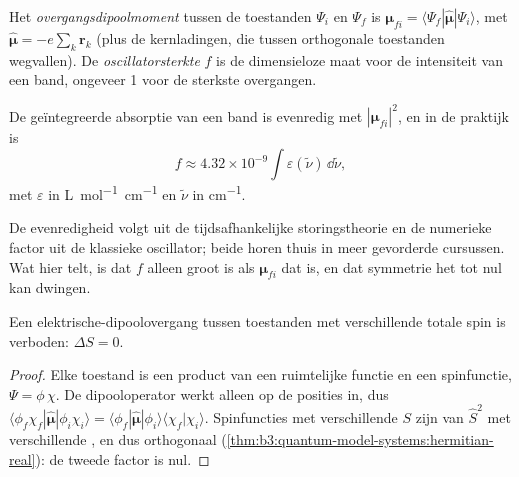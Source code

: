 \begin{definition}\label{def:b3:electronic-spectroscopy:transition-dipole}
Het \emph{overgangsdipoolmoment} tussen de
toestanden $\Psi_i$ en $\Psi_f$ is $\boldsymbol\mu_{fi} = \langle\Psi_f|\hat{\boldsymbol\mu}|\Psi_i
\rangle$, met $\hat{\boldsymbol\mu} = -e\sum_k\mathbf r_k$ (plus de
kernladingen, die tussen orthogonale toestanden wegvallen). De
\emph{oscillatorsterkte} $f$ is de dimensieloze
maat voor de intensiteit van een band, ongeveer 1 voor de sterkste
overgangen.
\end{definition}

\begin{proposition}\label{prop:b3:electronic-spectroscopy:intensity}
De geïntegreerde absorptie van een band is evenredig met $|\boldsymbol\mu_{fi}|^2$,
en in de praktijk is
\[
f \approx 4.32\times10^{-9}\int\varepsilon(\tilde\nu)\,\dd\tilde\nu,
\]
met $\varepsilon$ in \unit{L.mol^{-1}.cm^{-1}} en $\tilde\nu$ in \unit{cm^{-1}}.
\end{proposition}
\admitted

De evenredigheid volgt uit de tijdsafhankelijke storingstheorie en de
numerieke factor uit de klassieke oscillator; beide horen thuis in meer
gevorderde cursussen. Wat hier telt, is dat $f$ alleen groot is als
$\boldsymbol\mu_{fi}$ dat is, en dat symmetrie het tot nul kan dwingen.

\begin{theorem}[De spinselectieregel]\label{thm:b3:electronic-spectroscopy:spin-rule}
Een elektrische-dipoolovergang tussen toestanden met verschillende totale
spin is verboden: $\Delta S = 0$.
\end{theorem}

\begin{proof}
Elke toestand is een product van een ruimtelijke functie en een
spinfunctie, $\Psi = \phi\,\chi$.
De dipooloperator werkt alleen op de posities in, dus $\langle\phi_f\chi_f|\hat{\boldsymbol\mu}|
\phi_i\chi_i\rangle = \langle\phi_f|\hat{\boldsymbol\mu}|\phi_i\rangle\langle\chi_f|\chi_i\rangle$.
Spinfuncties met verschillende $S$ zijn  van $\hat S^2$ met
verschillende , en dus orthogonaal (\cref{thm:b3:quantum-model-systems:hermitian-real}):
de tweede factor is nul.
\end{proof}

